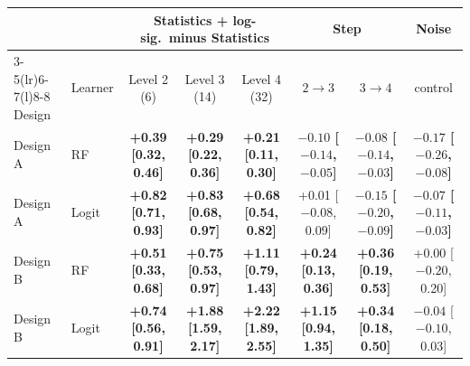 \begin{tabular}{@{}llcccccc@{}}
\toprule
 & & \multicolumn{3}{c}{Statistics + log-sig.\ minus Statistics} & \multicolumn{2}{c}{Step} & Noise \\
\cmidrule(lr){3-5}\cmidrule(lr){6-7}\cmidrule(l){8-8}
Design & Learner & Level 2 (6) & Level 3 (14) & Level 4 (32) & $2\to3$ & $3\to4$ & control \\
\midrule
Design A & RF & \textbf{\boldmath +0.39 [0.32, 0.46]} & \textbf{\boldmath +0.29 [0.22, 0.36]} & \textbf{\boldmath +0.21 [0.11, 0.30]} & \textbf{\boldmath $-0.10$ [$-0.14$, $-0.05$]} & \textbf{\boldmath $-0.08$ [$-0.14$, $-0.03$]} & \textbf{\boldmath $-0.17$ [$-0.26$, $-0.08$]} \\
Design A & Logit & \textbf{\boldmath +0.82 [0.71, 0.93]} & \textbf{\boldmath +0.83 [0.68, 0.97]} & \textbf{\boldmath +0.68 [0.54, 0.82]} & +0.01 [$-0.08$, 0.09] & \textbf{\boldmath $-0.15$ [$-0.20$, $-0.09$]} & \textbf{\boldmath $-0.07$ [$-0.11$, $-0.03$]} \\
Design B & RF & \textbf{\boldmath +0.51 [0.33, 0.68]} & \textbf{\boldmath +0.75 [0.53, 0.97]} & \textbf{\boldmath +1.11 [0.79, 1.43]} & \textbf{\boldmath +0.24 [0.13, 0.36]} & \textbf{\boldmath +0.36 [0.19, 0.53]} & +0.00 [$-0.20$, 0.20] \\
Design B & Logit & \textbf{\boldmath +0.74 [0.56, 0.91]} & \textbf{\boldmath +1.88 [1.59, 2.17]} & \textbf{\boldmath +2.22 [1.89, 2.55]} & \textbf{\boldmath +1.15 [0.94, 1.35]} & \textbf{\boldmath +0.34 [0.18, 0.50]} & $-0.04$ [$-0.10$, 0.03] \\
\bottomrule
\end{tabular}
